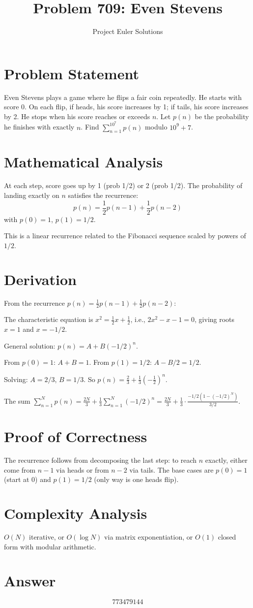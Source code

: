 \documentclass[11pt]{article}
\title{Problem 709: Even Stevens}
\author{Project Euler Solutions}
\date{}
\begin{document}
\maketitle

\section{Problem Statement}
Even Stevens plays a game where he flips a fair coin repeatedly. He starts with score 0. On each flip, if heads, his score increases by 1; if tails, his score increases by 2. He stops when his score reaches or exceeds $n$. Let $p(n)$ be the probability he finishes with exactly $n$. Find $\sum_{n=1}^{10^7} p(n)$ modulo $10^9+7$.

\section{Mathematical Analysis}
At each step, score goes up by 1 (prob 1/2) or 2 (prob 1/2). The probability of landing exactly on $n$ satisfies the recurrence:
$$p(n) = \frac{1}{2}p(n-1) + \frac{1}{2}p(n-2)$$
with $p(0) = 1$, $p(1) = 1/2$.

This is a linear recurrence related to the Fibonacci sequence scaled by powers of $1/2$.

\section{Derivation}
From the recurrence $p(n) = \frac{1}{2}p(n-1) + \frac{1}{2}p(n-2)$:

The characteristic equation is $x^2 = \frac{1}{2}x + \frac{1}{2}$, i.e., $2x^2 - x - 1 = 0$, giving roots $x = 1$ and $x = -1/2$.

General solution: $p(n) = A + B(-1/2)^n$.

From $p(0)=1$: $A+B=1$. From $p(1)=1/2$: $A-B/2=1/2$.

Solving: $A = 2/3$, $B = 1/3$. So $p(n) = \frac{2}{3} + \frac{1}{3}(-\frac{1}{2})^n$.

The sum $\sum_{n=1}^{N} p(n) = \frac{2N}{3} + \frac{1}{3}\sum_{n=1}^{N}(-1/2)^n = \frac{2N}{3} + \frac{1}{3} \cdot \frac{-1/2(1-(-1/2)^N)}{3/2}$.

\section{Proof of Correctness}
The recurrence follows from decomposing the last step: to reach $n$ exactly, either come from $n-1$ via heads or from $n-2$ via tails. The base cases are $p(0)=1$ (start at 0) and $p(1) = 1/2$ (only way is one heads flip).

\section{Complexity Analysis}
$O(N)$ iterative, or $O(\log N)$ via matrix exponentiation, or $O(1)$ closed form with modular arithmetic.

\section{Answer}

\[
\boxed{773479144}
\]
\end{document}

